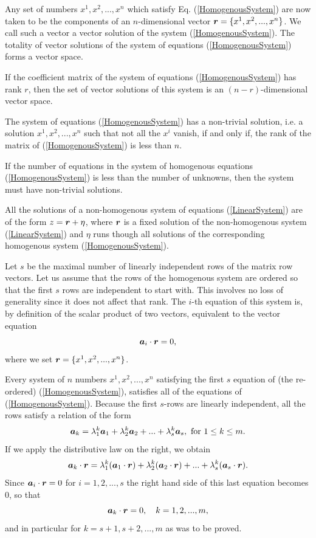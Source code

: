 Any set of numbers $x^1, x^2, ..., x^n$ which satisfy Eq. (\ref{HomogenousSystem}) are now taken to be the components of an $n$-dimensional vector $\boldsymbol{r} = \{x^1, x^2, ..., x^n\}$. 
We call such a vector a {\elevenit vector solution} of the system (\ref{HomogenousSystem}). The totality of vector solutions of the system of equations (\ref{HomogenousSystem}) forms a
vector space.

\begin{theorem}
If the coefficient matrix of the system of equations (\ref{HomogenousSystem}) has rank $r$, then the set of vector solutions of this system is an $(n-r)$-dimensional vector space. 
\end{theorem}

\begin{theorem}
The system of equations (\ref{HomogenousSystem}) has a non-trivial solution, i.e. a solution $x^1, x^2, ..., x^n$ such that not all the $x^i$ vanish, if and only if, the rank of the matrix of 
(\ref{HomogenousSystem}) is less than $n$.
\end{theorem}

\begin{theorem}
If the number of equations in the system of homogenous equations (\ref{HomogenousSystem}) is less than the number of unknowns, then the system must have non-trivial solutions. 
\end{theorem}

\begin{theorem}
All the solutions of a non-homogenous system of equations (\ref{LinearSystem}) are of the form $z = \boldsymbol{r} + \eta$, where $\boldsymbol{r}$ is a fixed solution of the non-homogenous system (\ref{LinearSystem})
and $\eta$ runs though all solutions of the corresponding homogenous system (\ref{HomogenousSystem}). 
\end{theorem}

Let $s$ be the maximal number of linearly independent rows of the matrix row vectors. Let us assume that the rows of the homogenous system are ordered so that the first $s$ rows are independent to 
start with. This involves no loss of generality since it does not affect that rank. The $i$-th equation of this system is, by definition of the scalar product of two vectors, equivalent to the vector equation
$$ \boldsymbol{a}_i \cdot \boldsymbol{r} = 0,$$ where we set $\boldsymbol{r} = \{x^1, x^2, ..., x^n\}$.

Every system of $n$ numbers $x^1, x^2, ..., x^n$ satisfying the first $s$ equation of (the re-ordered) (\ref{HomogenousSystem}), satisfies all of the equations of (\ref{HomogenousSystem}). Because
the first $s$-rows are linearly independent, all the rows satisfy a relation of the form
$$\boldsymbol{a}_k = \lambda^k_1 \boldsymbol{a}_1 + \lambda^k_2 \boldsymbol{a}_2 + ...  + \lambda^k_s \boldsymbol{a}_s, \hbox{~for~} 1\le k \le m.$$ If we apply the distributive law on the right, we obtain
$$\boldsymbol{a}_k \cdot \boldsymbol{r} =   \lambda^k_1 (\boldsymbol{a}_1\cdot \boldsymbol{r}) + \lambda^k_2 (\boldsymbol{a}_2 \cdot \boldsymbol{r})+ ...  + \lambda^k_s (\boldsymbol{a}_s\cdot \boldsymbol{r}).$$ Since $\boldsymbol{a}_i \cdot \boldsymbol{r} = 0$ for $i = 1,2, ..., s$ the right hand side 
of this last equation becomes $0$, so that $$\boldsymbol{a}_k \cdot \boldsymbol{r} = 0, \quad k = 1,2, ..., m,$$ and in particular for $k = s+1, s+2, ..., m$ as was to be proved.\\

